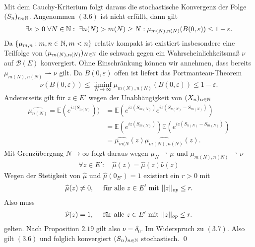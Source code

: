 \begin{proof*}
\begin{align}
    \end{align}
    Mit dem Cauchy-Kriterium folgt daraus die stochastische Konvergenz der Folge $(S_n)_{n \in \mathbb{N}}$. Angenommen $(3.6)$ ist nicht erfüllt, dann gilt
    \begin{align*}
        \exists \varepsilon > 0 \ \forall N \in \mathbb{N}: \ \exists n(N) > m(N) \geq N: \mu_{m(N), n(N)}(B(0, \varepsilon)) \leq 1 - \varepsilon.
    \end{align*}
    Da $\{\mu_{m,n}: m,n \in \mathbb{N}, m < n \}$ relativ kompakt ist existiert insbesondere eine Teilfolge von $(\mu_{m(N),n(N)})_{N \in \mathbb{N}}$ die schwach gegen ein Wahrscheinlichkeitsmaß $\nu$ auf $\mathcal{B}(E)$ konvergiert.
    Ohne Einschränkung können wir annehmen, dass bereits $\mu_{m(N),n(N)} \rightharpoonup \nu$ gilt. Da $B(0, \varepsilon)$ offen ist liefert das Portmanteau-Theorem
    \begin{align}
        \nu(B(0, \varepsilon)) \leq \liminf_{N \to \infty}\mu_{m(N),n(N)}(B(0,\varepsilon)) \leq 1 - \varepsilon. 
    \end{align}
    Andererseits gilt für $z \in E'$ wegen der Unabhängigkeit von $(X_n)_{n \in \mathbb{N}}$
    \begin{align*}
        \widehat{\mu_{n(N)}} = \mathbb{E}(e^{iz(S_{n(N)}})) &= \mathbb{E}(e^{iz(S_{m(N)})}e^{iz(S_{n(N)} - S_{m(N)})}) \\\
                                                   &= \mathbb{E}(e^{iz(S_{m(N)})})\mathbb{E}(e^{iz(S_{n(N)} - S_{m(N)})}) \\\
                                                   &= \widehat{\mu_{m(N}}(z)\widehat{\mu_{m(N),n(N)}}(z). 
    \end{align*}
    Mit Grenzübergang $N \to \infty$ folgt daraus wegen $\mu_N \rightharpoonup \mu$ und $\mu_{m(N),n(N)} \rightharpoonup \nu$
    \begin{align*}
        \forall z \in E': \quad \widehat{\mu}(z) = \widehat{\mu}(z) \widehat{\nu}(z)
    \end{align*}
    Wegen der Stetigkeit von $\widehat{\mu}$ und $\widehat{\mu}(0_{E'}) = 1$ existiert ein $r>0$ mit 
    \begin{align*}
        \widehat{\mu}(z) \neq 0, \quad \text{ für alle } z \in E' \text{ mit } \lvert\lvert z \rvert\rvert_{op} \leq r. 
    \end{align*}
    Also muss 
    \begin{align*}
        \widehat{\nu}(z) = 1, \quad \text{ für alle } z \in E' \text{ mit } \lvert\lvert z \rvert\rvert_{op} \leq r. 
    \end{align*}
    gelten. Nach Proposition $2.19$ gilt also $\nu = \delta_0$. Im Widerspruch zu $(3.7)$. Also gilt $(3.6)$ und folglich konvergiert $(S_n)_{n \in \mathbb{N}}$ stochastisch. 
    \qed
\end{proof*}

